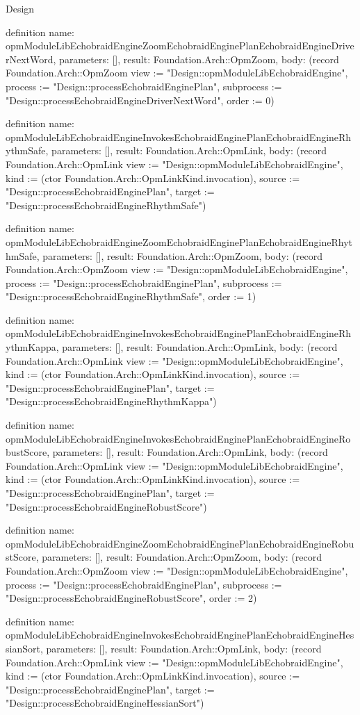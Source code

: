 \begin{lexlean}{Design}
\begin{semanticmodule}
definition{
  name: opmModuleLibEchobraidEngineZoomEchobraidEnginePlanEchobraidEngineDriverNextWord,
  parameters: [],
  result: Foundation.Arch::OpmZoom,
  body: (record Foundation.Arch::OpmZoom {view := "Design::opmModuleLibEchobraidEngine", process := "Design::processEchobraidEnginePlan", subprocess := "Design::processEchobraidEngineDriverNextWord", order := 0})
}

definition{
  name: opmModuleLibEchobraidEngineInvokesEchobraidEnginePlanEchobraidEngineRhythmSafe,
  parameters: [],
  result: Foundation.Arch::OpmLink,
  body: (record Foundation.Arch::OpmLink {view := "Design::opmModuleLibEchobraidEngine", kind := (ctor Foundation.Arch::OpmLinkKind.invocation), source := "Design::processEchobraidEnginePlan", target := "Design::processEchobraidEngineRhythmSafe"})
}

definition{
  name: opmModuleLibEchobraidEngineZoomEchobraidEnginePlanEchobraidEngineRhythmSafe,
  parameters: [],
  result: Foundation.Arch::OpmZoom,
  body: (record Foundation.Arch::OpmZoom {view := "Design::opmModuleLibEchobraidEngine", process := "Design::processEchobraidEnginePlan", subprocess := "Design::processEchobraidEngineRhythmSafe", order := 1})
}

definition{
  name: opmModuleLibEchobraidEngineInvokesEchobraidEnginePlanEchobraidEngineRhythmKappa,
  parameters: [],
  result: Foundation.Arch::OpmLink,
  body: (record Foundation.Arch::OpmLink {view := "Design::opmModuleLibEchobraidEngine", kind := (ctor Foundation.Arch::OpmLinkKind.invocation), source := "Design::processEchobraidEnginePlan", target := "Design::processEchobraidEngineRhythmKappa"})
}

definition{
  name: opmModuleLibEchobraidEngineInvokesEchobraidEnginePlanEchobraidEngineRobustScore,
  parameters: [],
  result: Foundation.Arch::OpmLink,
  body: (record Foundation.Arch::OpmLink {view := "Design::opmModuleLibEchobraidEngine", kind := (ctor Foundation.Arch::OpmLinkKind.invocation), source := "Design::processEchobraidEnginePlan", target := "Design::processEchobraidEngineRobustScore"})
}

definition{
  name: opmModuleLibEchobraidEngineZoomEchobraidEnginePlanEchobraidEngineRobustScore,
  parameters: [],
  result: Foundation.Arch::OpmZoom,
  body: (record Foundation.Arch::OpmZoom {view := "Design::opmModuleLibEchobraidEngine", process := "Design::processEchobraidEnginePlan", subprocess := "Design::processEchobraidEngineRobustScore", order := 2})
}

definition{
  name: opmModuleLibEchobraidEngineInvokesEchobraidEnginePlanEchobraidEngineHessianSort,
  parameters: [],
  result: Foundation.Arch::OpmLink,
  body: (record Foundation.Arch::OpmLink {view := "Design::opmModuleLibEchobraidEngine", kind := (ctor Foundation.Arch::OpmLinkKind.invocation), source := "Design::processEchobraidEnginePlan", target := "Design::processEchobraidEngineHessianSort"})
}


\end{semanticmodule}
\end{lexlean}
